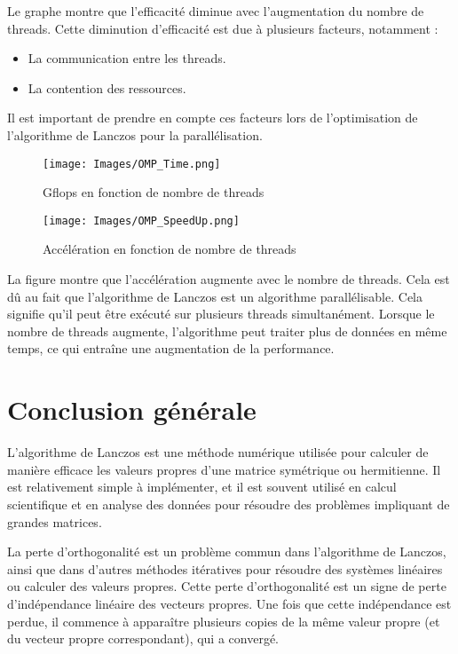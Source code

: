 \documentclass[11pt,french]{article}
\begin{document}
    Le graphe montre que l'efficacité diminue avec l'augmentation du nombre de threads. Cette diminution d'efficacité est due à plusieurs facteurs, notamment :
    \begin{itemize}
        \item La communication entre les threads.
        \item La contention des ressources.
    \end{itemize}
    
    Il est important de prendre en compte ces facteurs lors de l'optimisation de l'algorithme de Lanczos pour la parallélisation.
    \begin{figure}[h]
    \centering
    \texttt{[image: Images/OMP\_Time.png]}
    \caption{Gflops en fonction de nombre de threads}
    \label{fig:mesh1}
    \end{figure}
    \FloatBarrier
    
    \begin{figure}[h]
    \centering
    \texttt{[image: Images/OMP\_SpeedUp.png]}
    \caption{Accélération en fonction de nombre de threads}
    \label{fig:mesh1}
    \end{figure}
    \FloatBarrier
    
    La figure montre que l'accélération augmente avec le nombre de threads. Cela est dû au fait que l'algorithme de Lanczos est un algorithme parallélisable. Cela signifie qu'il peut être exécuté sur plusieurs threads simultanément. Lorsque le nombre de threads augmente, l'algorithme peut traiter plus de données en même temps, ce qui entraîne une augmentation de la performance.
    \FloatBarrier
	\newpage
	\section{Conclusion générale}
	L'algorithme de Lanczos est une méthode numérique utilisée pour calculer de manière efficace les valeurs propres d'une matrice symétrique ou hermitienne. Il est relativement simple à implémenter, et il est souvent utilisé en calcul scientifique et en analyse des données pour résoudre des problèmes impliquant de grandes matrices.

    La perte d'orthogonalité est un problème commun dans l'algorithme de Lanczos, ainsi que dans d'autres méthodes itératives pour résoudre des systèmes linéaires ou calculer des valeurs propres. Cette perte d’orthogonalité est un signe de perte d’indépendance linéaire des vecteurs propres. Une fois que cette indépendance est perdue, il commence à apparaître plusieurs copies de la même valeur propre (et du vecteur propre correspondant), qui a convergé.
\end{document}
